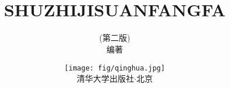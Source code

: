 
\title{\hei\vspace*{-2cm} \\{\vspace*{-1.2cm} SHUZHIJISUANFANGFA}}
\author{(第二版)\\\hspace{1em}编著}
\date{\vspace*{3cm}\centering\texttt{[image: fig/qinghua.jpg]}\\{\xingkai 清华大学出版社}$\cdot$北京}
\maketitle
